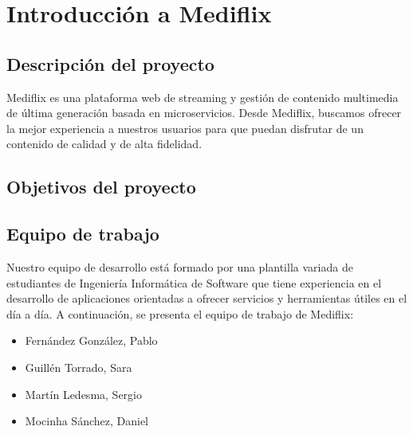 \documentclass[../main.tex]{subfiles}
\begin{document}
\section{Introducción a Mediflix}

\subsection{Descripción del proyecto}

Mediflix es una plataforma web de streaming y gestión de contenido multimedia de última generación basada en microservicios. Desde Mediflix, buscamos ofrecer la mejor experiencia a nuestros usuarios para que puedan disfrutar de un contenido de calidad y de alta fidelidad.\par

\subsection{Objetivos del proyecto}

\subsection{Equipo de trabajo}

Nuestro equipo de desarrollo está formado por una plantilla variada de estudiantes de Ingeniería Informática de Software que tiene experiencia en el desarrollo de aplicaciones orientadas a ofrecer servicios y herramientas útiles en el día a día. A continuación, se presenta el equipo de trabajo de Mediflix:\par

\begin{itemize}
    \item Fernández González, Pablo
    \item Guillén Torrado, Sara 
    \item Martín Ledesma, Sergio
    \item Mocinha Sánchez, Daniel
\end{itemize}
\end{document}
